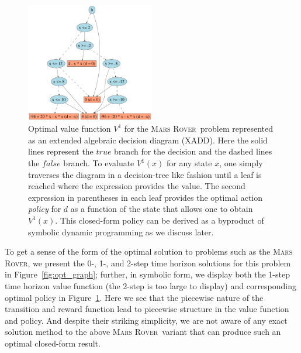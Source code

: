 \documentclass[letterpaper]{article}
\newcommand{\MarsRover}{\textsc{Mars Rover}}
\newcommand{\true}{\mathit{true}}
\newcommand{\false}{\mathit{false}}
\begin{document}
\begin{figure}[t!]
\centering
\includegraphics[width=0.5\textwidth]{Figures1/v2_mr_dd.pdf}
\caption{\footnotesize Optimal value function $V^1$ for the
\MarsRover\ problem represented as an extended algebraic decision
diagram (XADD).  Here the solid lines represent the $\true$ branch for
the decision and the dashed lines the $\false$ branch.  To evaluate
$V^1(x)$ for any state $x$, one simply traverses the diagram in a
decision-tree like fashion until a leaf is reached where the
expression provides the value.  The second expression in parentheses
in each leaf provides the optimal action \emph{policy} for $d$ as a
function of the state that allows one to obtain $V^1(x)$.  This
closed-form policy can be derived as a byproduct of symbolic dynamic
programming as we discuss later.}
\label{fig:opt_val_pol}
\end{figure}

To get a sense of the form of the optimal solution to problems such as
the \MarsRover, we present the 0-, 1-, and 2-step time horizon solutions
for this problem in Figure~\ref{fig:opt_graph}; further, in symbolic form,
we display both the 1-step time horizon value function (the 2-step is
too large to display) and corresponding optimal policy in
Figure~\ref{fig:opt_val_pol}.  Here we see that the piecewise 
nature of the transition and reward function lead to
piecewise structure in the value function and policy.  And 
despite their striking simplicity, we are not aware of any exact
solution method to the above \MarsRover\ variant that can produce
such an optimal closed-form result.
\end{document}

